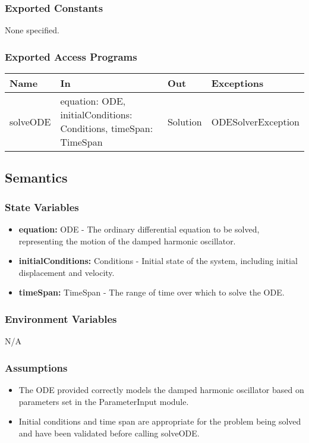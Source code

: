 \documentclass[12pt, titlepage]{article}
\begin{document}
\subsubsection{Exported Constants}
None specified.

\subsubsection{Exported Access Programs}

\begin{center}
\begin{tabular}{p{2cm} p{5cm} p{2cm} p{5cm}}
\hline
\textbf{Name} & \textbf{In} & \textbf{Out} & \textbf{Exceptions} \\
\hline
solveODE & equation: ODE, initialConditions: Conditions, timeSpan: TimeSpan & Solution & ODESolverException \\
\hline
\end{tabular}
\end{center}

\subsection{Semantics}

\subsubsection{State Variables}
\begin{itemize}
  \item \textbf{equation:} ODE - The ordinary differential equation to be solved, representing the motion of the damped harmonic oscillator.
  \item \textbf{initialConditions:} Conditions - Initial state of the system, including initial displacement and velocity.
  \item \textbf{timeSpan:} TimeSpan - The range of time over which to solve the ODE.
\end{itemize}

\subsubsection{Environment Variables}
N/A

\subsubsection{Assumptions}

\begin{itemize}
  \item The ODE provided correctly models the damped harmonic oscillator based on parameters set in the ParameterInput module.
  \item Initial conditions and time span are appropriate for the problem being solved and have been validated before calling solveODE.
\end{itemize}
\end{document}
